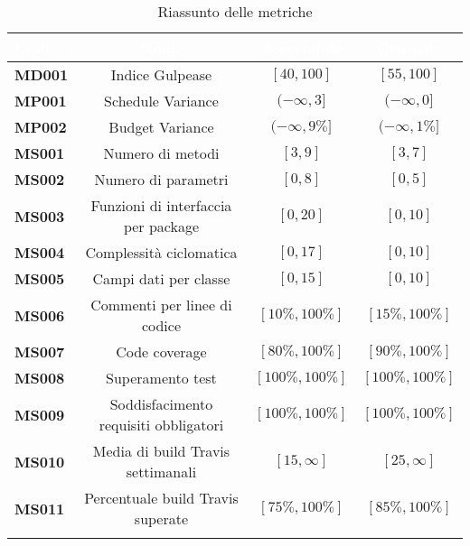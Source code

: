 	\renewcommand{\arraystretch}{1.5}
	\begin{longtable}{C{4cm} c c c}
	
	\textcolor{white}{\textbf{Codice}} &
	\textcolor{white}{\textbf{Nome}} &
	\textcolor{white}{\textbf{Accettabile}} &
	\textcolor{white}{\textbf{Ottimale}}\\
	\endhead

	\textbf{MD001} &
	Indice Gulpease &
	$[40 , 100] $&
	$[55 , 100]$\\

	\textbf{MP001} &
	Schedule Variance &
	$(-\infty , 3] $&
	$(-\infty , 0]$\\
	
	\textbf{MP002} &
	Budget Variance &
	$(-\infty , 9\%] $&
	$(-\infty , 1\%]$\\


	\textbf{MS001} &
	Numero di metodi &
	$[3 , 9] $&
	$[3 , 7]$\\
	
	\textbf{MS002} &
	Numero di parametri &
	$[0 , 8] $&
	$[0 , 5]$\\
	
	\textbf{MS003} &
	Funzioni di interfaccia per package &
	$[0 , 20] $&
	$[0 , 10]$\\
	
	\textbf{MS004} &
	Complessità ciclomatica &
	$[0 , 17] $&
	$[0 , 10]$\\
	
	\textbf{MS005} &
	Campi dati per classe &
	$[0 , 15] $&
	$[0 , 10]$\\
	
	\textbf{MS006} &
	Commenti per linee di codice &
	$[10\%, 100\%] $&
	$[15\% , 100\%]$\\
	
	\textbf{MS007} &
	Code coverage &
	$[80\%, 100\%]$&
	$[90\%, 100\%]$\\

	
	\textbf{MS008} &
	Superamento test &
	$[100\%, 100\%]$&
	$[100\%, 100\%]$\\
	
	\textbf{MS009} &
	Soddisfacimento requisiti obbligatori &
	$[100\%, 100\%]$&
	$[100\%, 100\%]$\\
	
	\textbf{MS010} &
	Media di build Travis settimanali &
	$[15,\infty]$&
	$[25,\infty]$\\
	
	\textbf{MS011} &
	Percentuale build Travis superate &
	$[75\%,100\%]$&
	$[85\%,100\%]$\\
	
	\caption{Riassunto delle metriche}\\	
	\end{longtable}